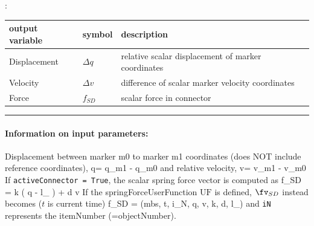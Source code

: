 :
\begin{center}
\footnotesize
\begin{longtable}{| p{5cm} | p{5cm} | p{6cm} |} 
\hline
\bf output variable & \bf symbol & \bf description \\ \hline
Displacement & $\Delta q$ & relative scalar displacement of marker coordinates\\ \hline
Velocity & $\Delta v$ & difference of scalar marker velocity coordinates\\ \hline
Force & $f_{SD}$ & scalar force in connector\\ \hline
\end{longtable}
\end{center}
\par\noindent\rule{\textwidth}{0.4pt}
\label{description_ObjectConnectorCoordinateSpringDamper}
\paragraph{Information on input parameters:} 
\finishTable
 \noindent
    \finishTable
    Displacement between marker m0 to marker m1 coordinates (does NOT include reference coordinates),
    \be
      \Delta q= q_{m1} - q_{m0}
    \ee
    and relative velocity,
    \be
      \Delta v= v_{m1} - v_{m0}
    \ee
    If \texttt{activeConnector = True}, the scalar spring force vector is computed as
    \be
      f_{SD} = k \left( \Delta q - l_ \right) + d \cdot \Delta v %
    \ee
    If the springForceUserFunction $\mathrm{UF}$ is defined, $\fv_{SD}$ instead becomes ($t$ is current time)
    \be
      f_{SD} = (mbs, t, i_N, \Delta q, \Delta v, k, d, l_)%
    \ee
    and \texttt{iN} represents the itemNumber (=objectNumber).

